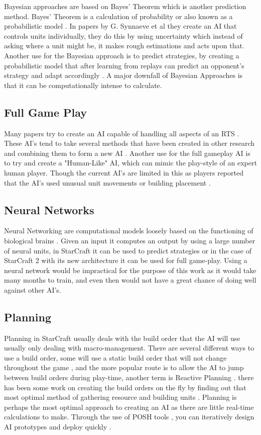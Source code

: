 \documentclass[journal]{IEEEtran}
\begin{document}
Bayesian approaches are based on Bayes' Theorem which is another prediction method. Bayes' Theorem is a calculation of probability or also known as a probabilistic model \cite{BayesianAI}. In papers by G. Synnaeve et al \cite{UnitsControl,SpecialTactics} they create an AI that controls units individually, they do this by using uncertainty which instead of asking where a unit might be, it makes rough estimations and acts upon that. Another use for the Bayesian approach is to predict strategies, by creating a probabilistic model that after learning from replays can predict an opponent's strategy and adapt accordingly \cite{Bayesian}. A major downfall of Bayesian Approaches is that it can be computationally intense to calculate.

\subsection{Full Game Play}
Many papers try to create an AI capable of handling all aspects of an RTS \cite{Agents,Hierarchical,HumanLevel,SCAIL}. These AI's tend to take several methods that have been created in other research and combining them to form a new AI \cite{Agents}. Another use for the full gameplay AI is to try and create a "Human-Like" AI, which can mimic the play-style of an expert human player. Though the current AI's are limited in this as players reported that the AI's used unusual unit movements or building placement \cite{EvalHuman}.

\subsection{Neural Networks}
Neural Networking are computational models loosely based on the functioning of biological brains \cite{Deep}. Given an input it computes an output by using a large number of neural units, in StarCraft it can be used to predict strategies or in the case of StarCraft 2 with its new architecture it can be used for full game-play. Using a neural network would be impractical for the purpose of this work as it would take many months to train, and even then would not have a great chance of doing well against other AI's.

\subsection{Planning}
Planning in StarCraft usually deals with the build order that the AI will use usually only dealing with macro-management. There are several different ways to use a build order, some will use a static build order that will not change throughout the game \cite{Swen}, and the more popular route is to allow the AI to jump between build orders during play-time, another term is Reactive Planning \cite{Fuzzy,OnlineEvo,GoalDriven}. there has been some work on creating the build orders on the fly by finding out that most optimal method of gathering resource and building units \cite{BuildOrder}. Planning is perhaps the most optimal approach to creating an AI as there are little real-time calculations to make. Through the use of POSH tools \cite{POSH}, you can iteratively design AI prototypes and deploy quickly \cite{Swen}. 
\end{document}
